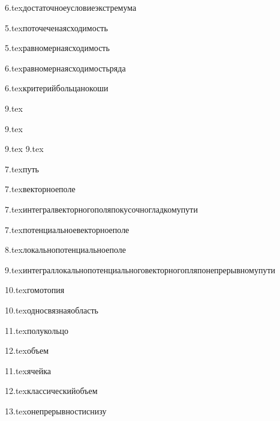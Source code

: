 {6.tex}{достаточноеусловиеэкстремума}

{5.tex}{поточеченаясходимость}

{5.tex}{равномернаясходимость}

{6.tex}{равномернаясходимостьряда}

{6.tex}{критерийбольцанокоши}

{9.tex}{}


{9.tex}{}
\?

{9.tex}{}\?
{9.tex}{}\?

{7.tex}{путь}

{7.tex}{векторноеполе}

{7.tex}{интегралвекторногополяпокусочногладкомупути}

{7.tex}{потенциальноевекторноеполе}

{8.tex}{локальнопотенциальноеполе}

{9.tex}{интеграллокальнопотенциальноговекторногопляпонепрерывномупути}

{10.tex}{гомотопия}

{10.tex}{односвязнаяобласть}

{11.tex}{полукольцо}

{12.tex}{объем}

{11.tex}{ячейка}

{12.tex}{классическийобъем}

{13.tex}{онепрерывностиснизу}

